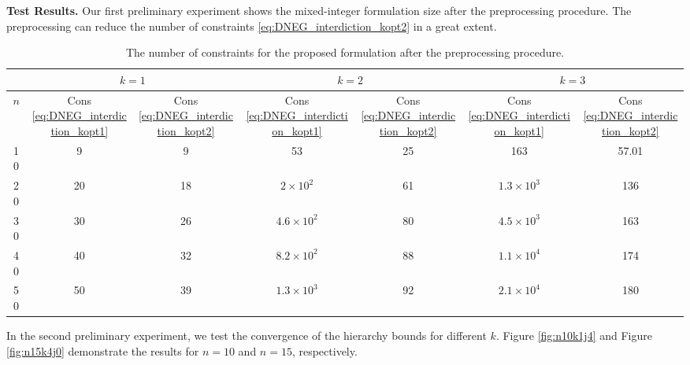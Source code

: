 \documentclass[11pt]{article}
\begin{document}
\noindent \textbf{Test Results.} Our first preliminary experiment shows the mixed-integer formulation size after the preprocessing procedure. The preprocessing can reduce the number of constraints \eqref{eq:DNEG_interdiction_kopt2} in a great extent. 

\begin{table}[htbp]
	\centering
	\caption{The number of constraints for the proposed formulation after the preprocessing procedure.}
	\begin{tabular}{ccc|cc|cc} \hline
		& \multicolumn{2}{c}{$k=1$} & \multicolumn{2}{c}{$k=2$} & \multicolumn{2}{c}{$k=3$} \\ \hline
		$n$    & Cons \eqref{eq:DNEG_interdiction_kopt1} & Cons \eqref{eq:DNEG_interdiction_kopt2} & Cons \eqref{eq:DNEG_interdiction_kopt1} & Cons \eqref{eq:DNEG_interdiction_kopt2} & Cons \eqref{eq:DNEG_interdiction_kopt1} & Cons \eqref{eq:DNEG_interdiction_kopt2} \\\hline
		10    & 9  & 9  & 53 & 25 & 163 & 57.01 \\
		20    & 20 & 18 & $2\times 10^2$ & 61 & $1.3\times 10^3$ & 136 \\
		30    & 30    & 26 & $4.6\times 10^2$ & 80 & $4.5\times 10^3$ & 163 \\
		40    & 40    & 32 & $8.2\times 10^2$ & 88 & $1.1\times 10^4$ & 174 \\
		50    & 50  & 39 & $1.3\times 10^3$ & 92 & $2.1\times 10^4$ & 180 \\ \hline
	\end{tabular}%
	\label{tab:addlabel}%
\end{table}%


In the second preliminary experiment, we test the convergence of the hierarchy bounds for different $k$. Figure \ref{fig:n10k1j4} and Figure \ref{fig:n15k4j0} demonstrate the results for $n=10$ and $n=15$, respectively.
\end{document}
